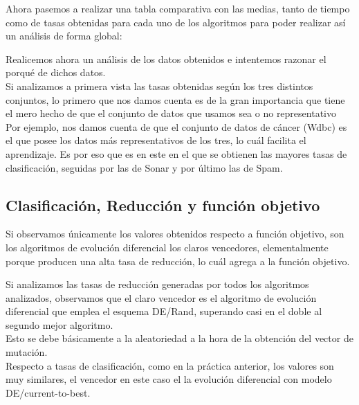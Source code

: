Ahora pasemos a realizar una tabla comparativa con las medias, tanto de tiempo como de tasas obtenidas para cada uno de los algoritmos para poder realizar así un análisis de forma global:

\noindent
{}%


Realicemos ahora un análisis de los datos obtenidos e intentemos razonar el porqué de dichos datos.\\ 

Si analizamos a primera vista las tasas obtenidas según los tres distintos conjuntos, lo primero que nos damos cuenta es de la gran importancia que tiene el mero hecho de que el conjunto de datos que usamos sea o no representativo\\ 
Por ejemplo, nos damos cuenta de que el conjunto de datos de cáncer (Wdbc) es el que posee los datos más representativos de los tres, lo cuál facilita el aprendizaje. Es por eso que es en este en el que se obtienen las mayores tasas de clasificación, seguidas por las de Sonar y por último las de Spam. 


\subsection{Clasificación, Reducción y función objetivo}
Si observamos únicamente los valores obtenidos respecto a función objetivo, son los algoritmos de evolución diferencial los claros vencedores, elementalmente porque producen una alta tasa de reducción, lo cuál agrega a la función objetivo.

Si analizamos las tasas de reducción generadas por todos los algoritmos analizados, observamos que el claro vencedor es el algoritmo de evolución diferencial que emplea el esquema DE/Rand, superando casi en el doble al segundo mejor algoritmo. \\ 
Esto se debe básicamente a la aleatoriedad a la hora de la obtención del vector de mutación.
\\ 
Respecto a tasas de clasificación, como en la práctica anterior, los valores son muy similares, el vencedor en este caso el la evolución diferencial con modelo DE/current-to-best. 

